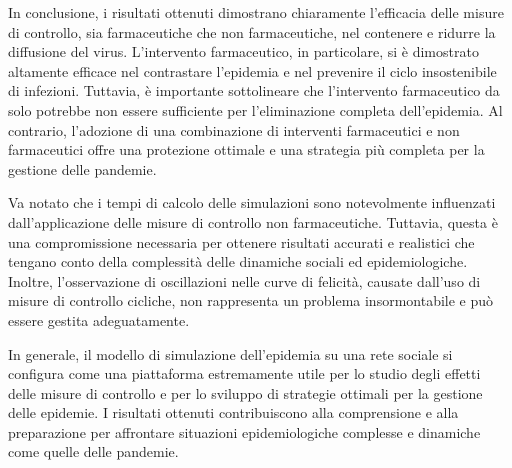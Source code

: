 In conclusione, i risultati ottenuti dimostrano chiaramente 
l'efficacia delle misure di controllo, sia farmaceutiche che non 
farmaceutiche, nel contenere e ridurre la diffusione del virus. 
L'intervento farmaceutico, in particolare, si è dimostrato altamente 
efficace nel contrastare l'epidemia e nel prevenire il ciclo 
insostenibile di infezioni. Tuttavia, è importante sottolineare che 
l'intervento farmaceutico da solo potrebbe non essere sufficiente per 
l'eliminazione completa dell'epidemia. Al contrario, l'adozione di una 
combinazione di interventi farmaceutici e non farmaceutici offre una 
protezione ottimale e una strategia più completa per la gestione delle 
pandemie.

Va notato che i tempi di calcolo delle simulazioni sono notevolmente 
influenzati dall'applicazione delle misure di controllo non farmaceutiche. 
Tuttavia, questa è una compromissione necessaria per ottenere risultati 
accurati e realistici che tengano conto della complessità delle dinamiche 
sociali ed epidemiologiche. Inoltre, l'osservazione di oscillazioni 
nelle curve di felicità, causate dall'uso di misure di controllo cicliche, 
non rappresenta un problema insormontabile e può essere gestita 
adeguatamente.

In generale, il modello di simulazione dell'epidemia su una rete sociale 
si configura come una piattaforma estremamente utile per lo studio degli 
effetti delle misure di controllo e per lo sviluppo di strategie ottimali 
per la gestione delle epidemie. I risultati ottenuti contribuiscono alla 
comprensione e alla preparazione per affrontare situazioni 
epidemiologiche complesse e dinamiche come quelle delle pandemie.